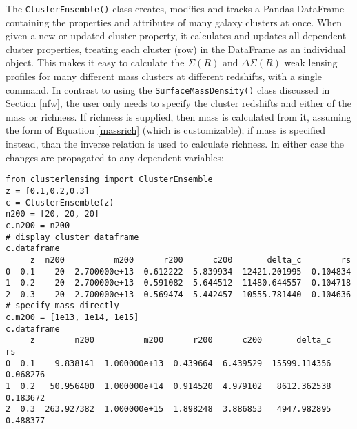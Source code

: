 \documentclass[twocolumn]{aastex6}
\newcommand{\code}{\lstinline[style=codeintext]}
\begin{document}
The \code{ClusterEnsemble()} class creates, modifies and tracks a Pandas DataFrame containing the properties and attributes of many galaxy clusters at once. When given a new or updated cluster property, it calculates and updates all dependent cluster properties, treating each cluster (row) in the DataFrame as an individual object. This makes it easy to calculate the $\Sigma(R)$ and $\Delta\Sigma(R)$ weak lensing profiles for many different mass clusters at different redshifts, with a single command. In contrast to using the \code{SurfaceMassDensity()} class discussed in Section \ref{nfw}, the user only needs to specify the cluster redshifts and either of the mass or richness. If richness is supplied, then mass is calculated from it, assuming the form of Equation \ref{massrich} (which is customizable); if mass is specified instead, than the inverse relation is used to calculate richness. In either case the changes are propagated to any dependent variables:
\begin{lstlisting}
from clusterlensing import ClusterEnsemble
z = [0.1,0.2,0.3]
c = ClusterEnsemble(z)
n200 = [20, 20, 20]
c.n200 = n200
# display cluster dataframe
c.dataframe
     z  n200          m200      r200      c200       delta_c        rs
0  0.1    20  2.700000e+13  0.612222  5.839934  12421.201995  0.104834
1  0.2    20  2.700000e+13  0.591082  5.644512  11480.644557  0.104718
2  0.3    20  2.700000e+13  0.569474  5.442457  10555.781440  0.104636
# specify mass directly
c.m200 = [1e13, 1e14, 1e15]
c.dataframe
     z        n200          m200      r200      c200       delta_c        rs
0  0.1    9.838141  1.000000e+13  0.439664  6.439529  15599.114356  0.068276
1  0.2   50.956400  1.000000e+14  0.914520  4.979102   8612.362538  0.183672
2  0.3  263.927382  1.000000e+15  1.898248  3.886853   4947.982895  0.488377
\end{lstlisting}
\end{document}
